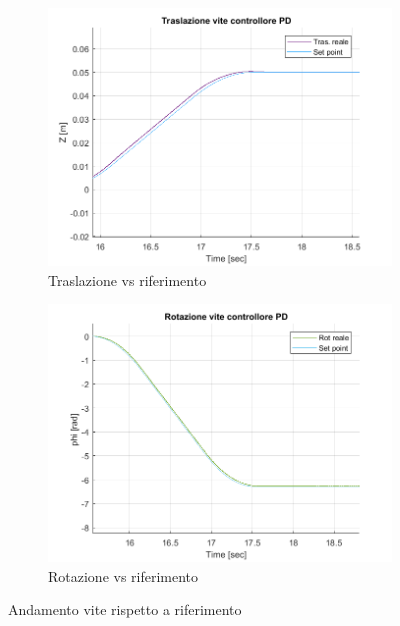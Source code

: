 \begin{figure}
	\begin{subfigure}{.5\textwidth}
		\includegraphics[width=1\linewidth]{Immagini/Traiettorie/TrasVitePD}  
		\caption{Traslazione vs riferimento}
		\label{fig:sub-v1}
	\end{subfigure}
	\begin{subfigure}{.5\textwidth}
		\includegraphics[width=1\linewidth]{Immagini/Traiettorie/RotVitePD}  
		\caption{Rotazione vs riferimento}
		\label{fig:sub-v2}
	\end{subfigure}
	\caption{Andamento vite rispetto a riferimento}
	\label{fig:ViteMovimenti}
\end{figure}
